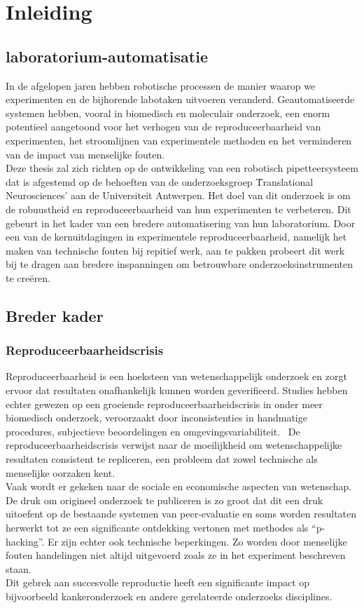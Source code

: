 \chapter{Inleiding}
\section{laboratorium-automatisatie}
In de afgelopen jaren hebben robotische processen de manier waarop we experimenten en de bijhorende labotaken uitvoeren veranderd. Geautomatiseerde systemen hebben, vooral in biomedisch en moleculair onderzoek, een enorm potentieel aangetoond voor het verhogen van de reproduceerbaarheid van experimenten, het stroomlijnen van experimentele methoden en het verminderen van de impact van menselijke fouten.\cite{RN5} 
\\[12pt]Deze thesis zal zich richten op de ontwikkeling van een robotisch pipetteersysteem dat is afgestemd op de behoeften van de onderzoeksgroep \'Translational Neurosciences' aan de Universiteit Antwerpen. Het doel van dit onderzoek is om de robuustheid en reproduceerbaarheid van hun experimenten te verbeteren. Dit gebeurt in het kader van een bredere automatisering van hun laboratorium. Door een van de kernuitdagingen in experimentele reproduceerbaarheid, namelijk het maken van technische fouten bij repitief werk, aan te pakken probeert dit werk bij te dragen aan bredere inspanningen om betrouwbare onderzoeksinstrumenten te creëren.

\section{Breder kader}

\subsection{Reproduceerbaarheidscrisis}
Reproduceerbaarheid is een hoeksteen van wetenschappelijk onderzoek en zorgt ervoor dat resultaten onafhankelijk kunnen worden geverifieerd. Studies hebben echter gewezen op een groeiende reproduceerbaarheidscrisis in onder meer biomedisch onderzoek, veroorzaakt door inconsistenties in handmatige procedures, subjectieve beoordelingen en omgevingsvariabiliteit.\ \cite{RN2} De reproduceerbaarheidscrisis verwijst naar de moeilijkheid om wetenschappelijke resultaten consistent te repliceren, een probleem dat zowel technische als menselijke oorzaken kent. 
\\[12pt]Vaak wordt er gekeken naar de sociale en economische aspecten van wetenschap.\cite{RN12} De druk om origineel onderzoek te publiceren is zo groot dat dit een druk uitoefent op de bestaande systemen van peer-evaluatie en soms worden resultaten herwerkt tot ze een significante ontdekking vertonen met methodes als “p-hacking”.\cite{RN2,RN6} Er zijn echter ook technische beperkingen. Zo worden door menselijke fouten handelingen niet altijd uitgevoerd zoals ze in het experiment beschreven staan. 
\\[12pt]Dit gebrek aan succesvolle reproductie heeft een significante impact op bijvoorbeeld kankeronderzoek en andere gerelateerde onderzoeks disciplines.\ \cite{RN4}
